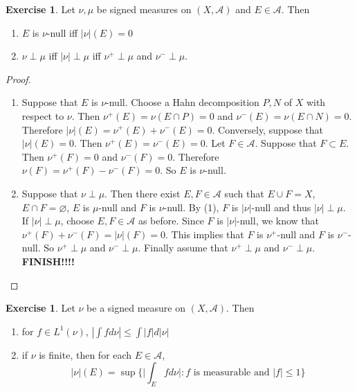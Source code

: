 \documentclass[12pt]{amsart}
\theoremstyle{definition}
\newtheorem{ex}[definition]{Exercise}
\newcommand{\MA}{\mathcal{A}}
\newcommand{\lex}[1]{\label{ex:#1}}
\begin{document}
	\begin{ex} \lex{41014} 
		Let $\nu, \mu$ be signed measures on $(X,\MA)$ and $E \in \MA$. Then 
		\begin{enumerate}
			\item $E$ is $\nu$-null iff $|\nu|(E) = 0$
			\item $\nu \perp \mu$ iff $|\nu| \perp \mu$ iff $\nu^+ \perp \mu$ and $\nu^- \perp \mu$.
		\end{enumerate}
	\end{ex}
	
	\begin{proof}
		\begin{enumerate}
			\item Suppose that $E$ is $\nu$-null. Choose a Hahn decomposition $P,N$ of $X$ with respect to $\nu$. Then $\nu^+(E) = \nu(E \cap P) = 0$ and $\nu^-(E) = \nu(E \cap N) = 0$. Therefore $|\nu|(E) = \nu^+(E) + \nu^-(E) = 0$. Conversely, suppose that $|\nu|(E) = 0$. Then $\nu^+(E) = \nu^-(E) = 0$. Let $F \in \MA$. Suppose that $F \subset E$. Then $\nu^+(F) = 0$ and $\nu^-(F) = 0$. Therefore $\nu(F) = \nu^+(F) - \nu^-(F) = 0$. So $E$ is $\nu$-null.
			
			\item Suppose that $\nu \perp \mu$. Then there exist $E,F \in \MA$ such that $E \cup F = X$, $E \cap F = \varnothing$, $E$ is $\mu$-null and $F$ is $\nu$-null. By (1), $F$ is $|\nu|$-null and thus $|\nu| \perp \mu$. If $|\nu| \perp \mu$, choose $E,F \in \MA$ as before. Since $F$ is $|\nu|$-null, we know that $\nu^+(F) + \nu^-(F) = |\nu|(F) = 0$. This implies that $F$ is $\nu^+$-null and $F$ is $\nu^-$-null. So $\nu^+ \perp \mu$ and $\nu^- \perp \mu$. Finally assume that $\nu^+ \perp \mu$ and $\nu^- \perp \mu$. \textbf{FINISH!!!!}
			
		\end{enumerate}
	\end{proof}
	
	\begin{ex} \lex{41015} 
		Let $\nu$ be a signed measure on $(X, \MA)$. Then 
		\begin{enumerate}
			\item for $f \in L^1(\nu)$, $|\int f d \nu| \leq \int |f| d |\nu|$
			\item if $\nu$ is finite, then for each $E \in \MA$, $$|\nu|(E) = \sup \bigg\{\bigg|\int_E f d \nu \bigg|: f  \text{ is measurable and } |f| \leq 1 \bigg \}$$
		\end{enumerate}
	\end{ex}
	
\end{document}
